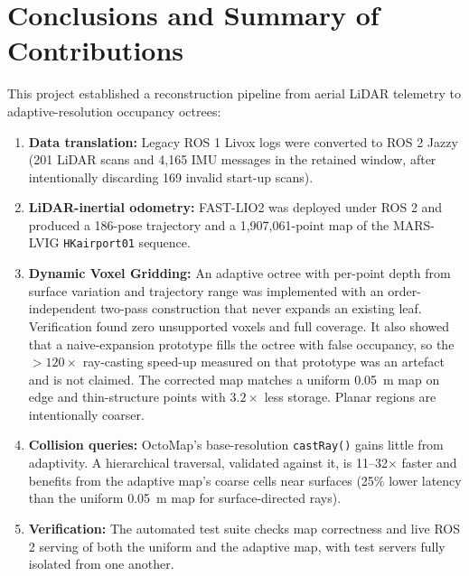 \documentclass[11pt,a4paper]{report}
\begin{document}
\section{Conclusions and Summary of Contributions}
This project established a reconstruction pipeline from aerial LiDAR telemetry to adaptive-resolution occupancy octrees:
\begin{enumerate}
    \item \textbf{Data translation:} Legacy ROS 1 Livox logs were converted to ROS 2 Jazzy (201 LiDAR scans and 4,165 IMU messages in the retained window, after intentionally discarding 169 invalid start-up scans).
    \item \textbf{LiDAR-inertial odometry:} FAST-LIO2 was deployed under ROS 2 and produced a 186-pose trajectory and a 1,907,061-point map of the MARS-LVIG \texttt{HKairport01} sequence.
    \item \textbf{Dynamic Voxel Gridding:} An adaptive octree with per-point depth from surface variation and trajectory range was implemented with an order-independent two-pass construction that never expands an existing leaf. Verification found zero unsupported voxels and full coverage. It also showed that a naive-expansion prototype fills the octree with false occupancy, so the $>120\times$ ray-casting speed-up measured on that prototype was an artefact and is not claimed. The corrected map matches a uniform 0.05~m map on edge and thin-structure points with $3.2\times$ less storage. Planar regions are intentionally coarser.
    \item \textbf{Collision queries:} OctoMap's base-resolution \texttt{castRay()} gains little from adaptivity. A hierarchical traversal, validated against it, is 11--32$\times$ faster and benefits from the adaptive map's coarse cells near surfaces (25\% lower latency than the uniform 0.05~m map for surface-directed rays).
    \item \textbf{Verification:} The automated test suite checks map correctness and live ROS 2 serving of both the uniform and the adaptive map, with test servers fully isolated from one another.
\end{enumerate}
\end{document}
